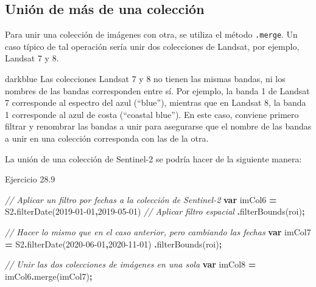 \documentclass[
  12pt,
  letterpaper,
  twoside]{book}
\newenvironment{Shaded}{\begin{snugshade}}{\end{snugshade}}
\newcommand{\CommentTok}[1]{\textcolor[rgb]{0.56,0.35,0.01}{\textit{#1}}}
\newcommand{\FunctionTok}[1]{\textcolor[rgb]{0.00,0.00,0.00}{#1}}
\newcommand{\KeywordTok}[1]{\textcolor[rgb]{0.13,0.29,0.53}{\textbf{#1}}}
\newcommand{\NormalTok}[1]{#1}
\newcommand{\OperatorTok}[1]{\textcolor[rgb]{0.81,0.36,0.00}{\textbf{#1}}}
\newcommand{\StringTok}[1]{\textcolor[rgb]{0.31,0.60,0.02}{#1}}
\begin{document}
\hypertarget{uniuxf3n-de-muxe1s-de-una-colecciuxf3n}{%
\subsection{Unión de más de una colección}\label{uniuxf3n-de-muxe1s-de-una-colecciuxf3n}}

Para unir una colección de imágenes con otra, se utiliza el método \texttt{.merge}. Un caso típico de tal operación sería unir dos colecciones de Landsat, por ejemplo, Landsat 7 y 8.

\begin{bluebox2}

\begin{awesomeblock}{5pt}{\faLightbulb}{darkblue}
Las colecciones Landsat 7 y 8 no tienen las mismas bandas, ni los nombres de las bandas corresponden entre sí. Por ejemplo, la banda 1 de Landsat 7 corresponde al espectro del azul (``blue''), mientras que en Landsat 8, la banda 1 corresponde al azul de costa (``coastal blue''). En este caso, conviene primero filtrar y renombrar las bandas a unir para asegurarse que el nombre de las bandas a unir en una colección corresponda con las de la otra.

\end{awesomeblock}

\end{bluebox2}

La unión de una colección de Sentinel-2 se podría hacer de la siguiente manera:

Ejercicio 28.9

\begin{Shaded}
\begin{Highlighting}[]
\CommentTok{// Aplicar un filtro por fechas a la colección de Sentinel{-}2}
\KeywordTok{var}\NormalTok{ imCol6 }\OperatorTok{=}\NormalTok{ S2}\OperatorTok{.}\FunctionTok{filterDate}\NormalTok{(}\StringTok{\textquotesingle{}2019{-}01{-}01\textquotesingle{}}\OperatorTok{,}\StringTok{\textquotesingle{}2019{-}05{-}01\textquotesingle{}}\NormalTok{)}
  \CommentTok{// Aplicar filtro espacial}
  \OperatorTok{.}\FunctionTok{filterBounds}\NormalTok{(roi)}\OperatorTok{;}

\CommentTok{// Hacer lo mismo que en el caso anterior, pero cambiando las fechas}
\KeywordTok{var}\NormalTok{ imCol7 }\OperatorTok{=}\NormalTok{ S2}\OperatorTok{.}\FunctionTok{filterDate}\NormalTok{(}\StringTok{\textquotesingle{}2020{-}06{-}01\textquotesingle{}}\OperatorTok{,}\StringTok{\textquotesingle{}2020{-}11{-}01\textquotesingle{}}\NormalTok{)}
  \OperatorTok{.}\FunctionTok{filterBounds}\NormalTok{(roi)}\OperatorTok{;}

\CommentTok{// Unir las dos colecciones de imágenes en una sola  }
\KeywordTok{var}\NormalTok{ imCol8 }\OperatorTok{=}\NormalTok{ imCol6}\OperatorTok{.}\FunctionTok{merge}\NormalTok{(imCol7)}\OperatorTok{;}
\end{Highlighting}
\end{Shaded}
\end{document}
